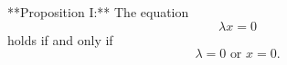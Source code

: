 **Proposition I:** The equation
$$\lambda x = 0$$
holds if and only if
$$\lambda = 0 \text{ or } x = 0.$$
